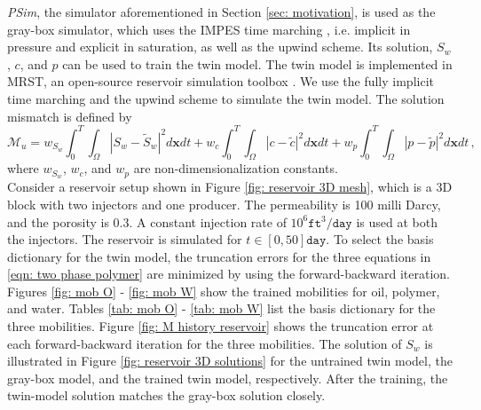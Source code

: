 \emph{PSim}, the simulator aforementioned in Section \ref{sec: motivation}, is
used as the gray-box simulator, which uses the IMPES time marching 
\cite{reservoir sim book}, i.e. implicit in pressure
and explicit in saturation, as well as the upwind scheme.
Its solution, $S_w$, $c$, and $p$ can be used to train the 
twin model. The twin model is implemented in MRST, an open-source reservoir simulation toolbox
\cite{MRST}.
We use the fully implicit time marching and the upwind scheme to simulate the twin model.
The solution mismatch is defined by
\begin{equation}
    \mathcal{M}_u = w_{S_w}\int_0^T\int_\Omega |S_w-\tilde{S}_w|^2 d\boldsymbol{x} dt
                + w_{c}\int_0^T\int_\Omega |c-\tilde{c}|^2 d\boldsymbol{x} dt 
                + w_{p}\int_{0}^T\int_\Omega |p-\tilde{p}|^2 d\boldsymbol{x} dt\,,
    \label{eqn: polymer sol mismatch}
\end{equation}
where $w_{S_w}$, $w_c$, and $w_p$ are non-dimensionalization constants.\\


Consider a reservoir setup shown in Figure \ref{fig: reservoir 3D mesh}, which
is a 3D block with two injectors and one producer. The permeability
is 100 milli Darcy, and the porosity is 0.3. A constant injection rate of $10^6 
\texttt{ft}^3/\texttt{day}$ is used at both the injectors.
The reservoir is simulated for $t\in [0,50] \texttt{day}$.
To select the basis dictionary for the twin model, the truncation errors for the 
three equations in \eqref{eqn: two phase polymer} are minimized by using the forward-backward
iteration.
Figures \ref{fig: mob O} - \ref{fig: mob W} show the trained mobilities for
oil, polymer, and water. Tables \ref{tab: mob O} - \ref{tab: mob W} list the
basis dictionary for the three mobilities. 
Figure \ref{fig: M history reservoir} shows the truncation error at each forward-backward
iteration for the three mobilities.
The solution of $S_w$ is illustrated in Figure \ref{fig: reservoir 3D solutions} for the untrained 
twin model, the gray-box model, and the trained twin model, respectively. 
After the training, the twin-model solution matches the gray-box solution closely.\\

